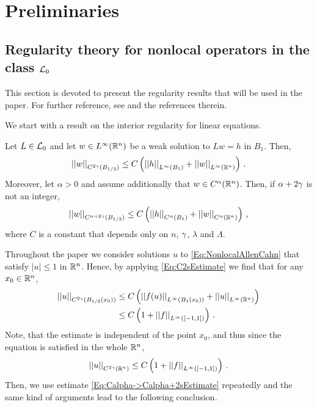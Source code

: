 \section{Preliminaries}
\label{Sec:Preliminaries}


\subsection{Regularity theory for nonlocal operators in the class $\mathcal{L}_0$}
\label{Subsec:Regularity}


This section is devoted to present the regularity results that will be used in the paper. For further reference, see \cite{RosOton-Survey,SerraC2s+alphaRegularity} and the references therein.

We start with a result on the interior regularity for linear equations.

\begin{proposition}
\label{Prop:InteriorRegularity}
Let $L\in\mathcal{L}_0$ and let $w\in L^\infty (\mathbb{R}^n)$ be a weak solution to $Lw = h$ in $B_1$. Then,
\begin{equation}
\label{Eq:C2sEstimate}
\left | \left |{w} \right | \right |_{C^{2\gamma} (B_{1/2})} \leq C\left ( {\left | \left |{h} \right | \right |_{L^\infty (B_1)} + \left | \left |{w} \right | \right |_{L^\infty  (\mathbb{R}^n)} }\right )\,.
\end{equation}
Moreover, let $\alpha > 0$ and assume additionally that $w \in C^\alpha (\mathbb{R}^n)$. Then, if $\alpha + 2\gamma$ is not an integer,
\begin{equation}
\label{Eq:Calpha->Calpha+2sEstimate}
\left | \left |{w} \right | \right |_{C^{\alpha + 2\gamma} (B_{1/2})} \leq C\left ( {\left | \left |{h} \right | \right |_{C^{\alpha} (B_1)} + \left | \left |{w} \right | \right |_{C^\alpha (\mathbb{R}^n)} }\right )\,,
\end{equation}
where $C$ is a constant that depends only on $n$, $\gamma$, $\lambda$ and $\Lambda$.
\end{proposition}

Throughout the paper we consider solutions $u$ to \eqref{Eq:NonlocalAllenCahn} that satisfy $|u|\leq 1$ in $\mathbb{R}^n$. Hence, by applying \eqref{Eq:C2sEstimate} we find that for any $x_0\in \mathbb{R}^n$, 
\begin{align*}
\left | \left |{u} \right | \right |_{C^{2\gamma} (B_{1/2} (x_0))} &\leq C\left ( {\left | \left |{f(u)} \right | \right |_{L^\infty (B_1(x_0))} + \left | \left |{u} \right | \right |_{L^\infty  (\mathbb{R}^n)} }\right ) \\
&\leq C\left ( {1 + \left | \left |{f} \right | \right |_{L^\infty ([-1,1])} }\right )\,.
\end{align*}
Note, that the estimate is independent of the point $x_0$, and thus since the equation is satisfied in the whole $\mathbb{R}^n$,
$$
\left | \left |{u} \right | \right |_{C^{2\gamma}(\mathbb{R}^n)} \leq C\left ( {1 + \left | \left |{f} \right | \right |_{L^\infty ([-1,1])} }\right )\,.
$$
Then, we use estimate \eqref{Eq:Calpha->Calpha+2sEstimate} repeatedly and  the same kind of arguments lead to the following conclusion.

